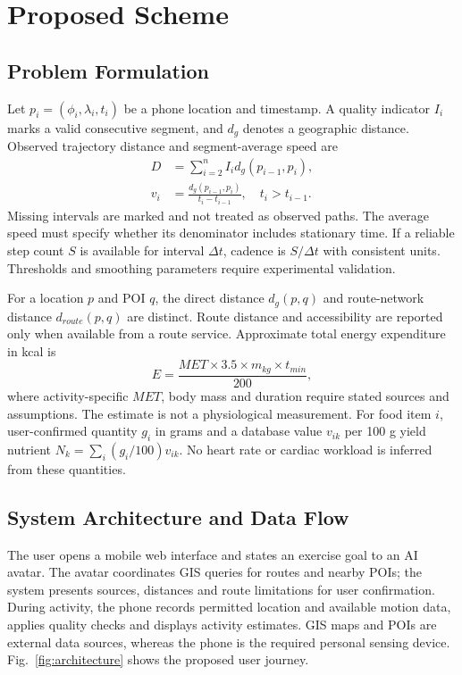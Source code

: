 \section{Proposed Scheme}\label{sec:method}
\subsection{Problem Formulation}
Let $p_i=(\phi_i,\lambda_i,t_i)$ be a phone location and timestamp. A quality indicator $I_i$ marks a valid consecutive segment, and $d_g$ denotes a geographic distance. Observed trajectory distance and segment-average speed are
\begin{align}
D &= \sum_{i=2}^{n} I_i d_g(p_{i-1},p_i),\label{eq:distance}\\
v_i &= \frac{d_g(p_{i-1},p_i)}{t_i-t_{i-1}},\quad t_i>t_{i-1}.\label{eq:speed}
\end{align}
Missing intervals are marked and not treated as observed paths. The average speed must specify whether its denominator includes stationary time. If a reliable step count $S$ is available for interval $\Delta t$, cadence is $S/\Delta t$ with consistent units. Thresholds and smoothing parameters require experimental validation.

For a location $p$ and POI $q$, the direct distance $d_g(p,q)$ and route-network distance $d_{route}(p,q)$ are distinct. Route distance and accessibility are reported only when available from a route service. Approximate total energy expenditure in kcal is
\begin{equation}
E=\frac{MET\times3.5\times m_{kg}\times t_{min}}{200},\label{eq:energy}
\end{equation}
where activity-specific $MET$, body mass and duration require stated sources and assumptions. The estimate is not a physiological measurement. For food item $i$, user-confirmed quantity $g_i$ in grams and a database value $v_{ik}$ per 100 g yield nutrient $N_k=\sum_i(g_i/100)v_{ik}$. No heart rate or cardiac workload is inferred from these quantities.

\subsection{System Architecture and Data Flow}
The user opens a mobile web interface and states an exercise goal to an AI avatar. The avatar coordinates GIS queries for routes and nearby POIs; the system presents sources, distances and route limitations for user confirmation. During activity, the phone records permitted location and available motion data, applies quality checks and displays activity estimates. GIS maps and POIs are external data sources, whereas the phone is the required personal sensing device. Fig.~\ref{fig:architecture} shows the proposed user journey.


